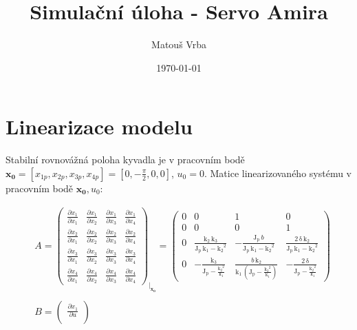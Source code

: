 \documentclass[a4paper,12pt]{article}
\title{Simulační úloha - Servo Amira}
\author{Matouš Vrba}
\date{\today}
\begin{document}
\maketitle
\pagebreak
\section{Linearizace modelu}
Stabilní rovnovážná poloha kyvadla je v pracovním bodě $\mathbf{x_0} = [x_{1p}, x_{2p}, x_{3p}, x_{4p}] = [0, -\frac{\pi}{2}, 0, 0]$, ${u_0} = 0$.
\newline
Matice linearizovaného systému v pracovním bodě $\mathbf{x_0}, u_0$:

\renewcommand{\arraystretch}{1.3}
{\Large
\begin{align*}
&A = 
\begin{pmatrix}
\frac{\partial x_1}{\partial x_1} & \frac{\partial x_1}{\partial x_2} & \frac{\partial x_1}{\partial x_3} & \frac{\partial x_1}{\partial x_4}	\\
\frac{\partial x_2}{\partial x_1} & \frac{\partial x_2}{\partial x_2} & \frac{\partial x_2}{\partial x_3} & \frac{\partial x_2}{\partial x_4}	\\
\frac{\partial x_3}{\partial x_1} & \frac{\partial x_3}{\partial x_2} & \frac{\partial x_3}{\partial x_3} & \frac{\partial x_3}{\partial x_4}	\\
\frac{\partial x_4}{\partial x_1} & \frac{\partial x_4}{\partial x_2} & \frac{\partial x_4}{\partial x_3} & \frac{\partial x_4}{\partial x_4}
\end{pmatrix}_{\biggr\rvert_\mathbf{x_0}} =
\left(\begin{array}{cccc} 0 & 0 & 1 & 0\\ 0 & 0 & 0 & 1\\ 0 & \frac{\mathrm{k_2}\, \mathrm{k_3}}{\mathrm{J_p}\, \mathrm{k_1} - {\mathrm{k_2}}^2} & -\frac{\mathrm{J_p}\, b}{\mathrm{J_p}\, \mathrm{k_1} - {\mathrm{k_2}}^2} & \frac{2\, \mathrm{\delta}\, \mathrm{k_2}}{\mathrm{J_p}\, \mathrm{k_1} - {\mathrm{k_2}}^2}\\ 0 & -\frac{\mathrm{k_3}}{\mathrm{J_p} - \frac{{\mathrm{k_2}}^2}{\mathrm{k_1}}} & \frac{b\, \mathrm{k_2}}{\mathrm{k_1}\, \left(\mathrm{J_p} - \frac{{\mathrm{k_2}}^2}{\mathrm{k_1}}\right)} & -\frac{2\, \mathrm{\delta}}{\mathrm{J_p} - \frac{{\mathrm{k_2}}^2}{\mathrm{k_1}}} \end{array}\right)	\\ \\
&B =
\begin{pmatrix}
\frac{\partial x_1}{\partial u}	\\

\end{pmatrix}
\end{align*}}
\end{document}
